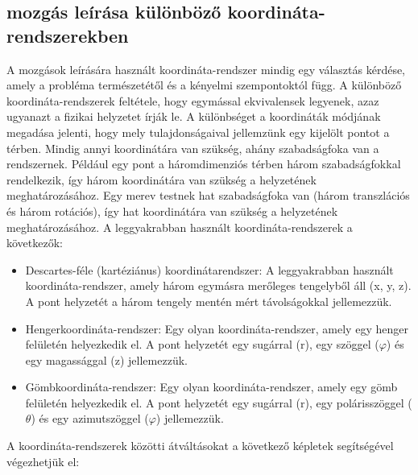 \documentclass[a4paper,12pt]{article}
\begin{document}
\subsection{mozgás leírása különböző koordináta-rendszerekben}
A mozgások leírására használt koordináta-rendszer mindig egy választás kérdése, amely a probléma természetétől és a kényelmi szempontoktól függ. A különböző koordináta-rendszerek feltétele, hogy egymással ekvivalensek legyenek,
azaz ugyanazt a fizikai helyzetet írják le. A különbséget a koordináták módjának megadása jelenti, hogy mely tulajdonságaival jellemzünk egy kijelölt pontot a térben. Mindig annyi koordinátára van szükség, ahány szabadságfoka van a rendszernek.
Például egy pont a háromdimenziós térben három szabadságfokkal rendelkezik, így három koordinátára van szükség a helyzetének meghatározásához. Egy merev testnek hat szabadságfoka van (három transzlációs és három rotációs),
így hat koordinátára van szükség a helyzetének meghatározásához. A leggyakrabban használt koordináta-rendszerek a következők:
\begin{itemize}
    \item Descartes-féle (kartéziánus) koordinátarendszer: A leggyakrabban használt koordináta-rendszer, amely három egymásra merőleges tengelyből áll (x, y, z). A pont helyzetét a három tengely mentén mért távolságokkal jellemezzük.
    \item Hengerkoordináta-rendszer: Egy olyan koordináta-rendszer, amely egy henger felületén helyezkedik el. A pont helyzetét egy sugárral (r), egy szöggel ($\varphi$) és egy magassággal (z) jellemezzük.
    \item Gömbkoordináta-rendszer: Egy olyan koordináta-rendszer, amely egy gömb felületén helyezkedik el. A pont helyzetét egy sugárral (r), egy polárisszöggel ($\theta$) és egy azimutszöggel ($\varphi$) jellemezzük.
\end{itemize}
A koordináta-rendszerek közötti átváltásokat a következő képletek segítségével végezhetjük el:
\end{document}
